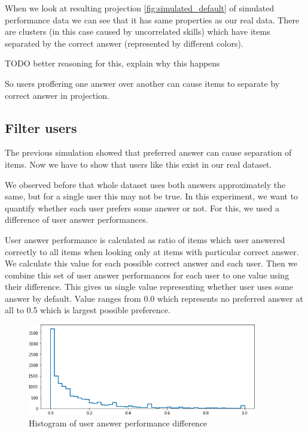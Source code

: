 \documentclass[
  digital, %
  table,   %
  nolof,     %
  nolot,     %
  nocover,
  color
]{fithesis3}
\begin{document}
When we look at resulting projection \ref{fig:simulated_default} of simulated performance data we can see that it has same properties as our real data. There are clusters (in this case caused by uncorrelated skills) which have items separated by the correct answer (represented by different colors).

TODO better reasoning for this, explain why this happens

So users proffering one answer over another can cause items to separate by correct answer in projection.


\subsection{Filter users}\label{filter-users}


The previous simulation showed that preferred answer can cause separation of items. Now we have to show that users like this exist in our real dataset.

We observed before that whole dataset uses both answers approximately the same, but for a single user this may not be true. In this experiment, we want to quantify whether each user prefers some answer or not. For this, we used a difference of user answer performances.

User answer performance is calculated as ratio of items which user answered correctly to all items when looking only at items with particular correct answer. We calculate this value for each possible correct answer and each user. Then we combine this set of user answer performances for each user to one value using their difference. This gives us single value representing whether user uses some answer by default. Value ranges from 0.0 which represents no preferred answer at all to 0.5 which is largest possible preference.

\begin{figure}
  \includegraphics[width=10cm]{img/uneven_answers_hist}
  \caption{Histogram of user answer performance difference}
  \label{fig:uneven_answers_hist}
\end{figure}
\end{document}
